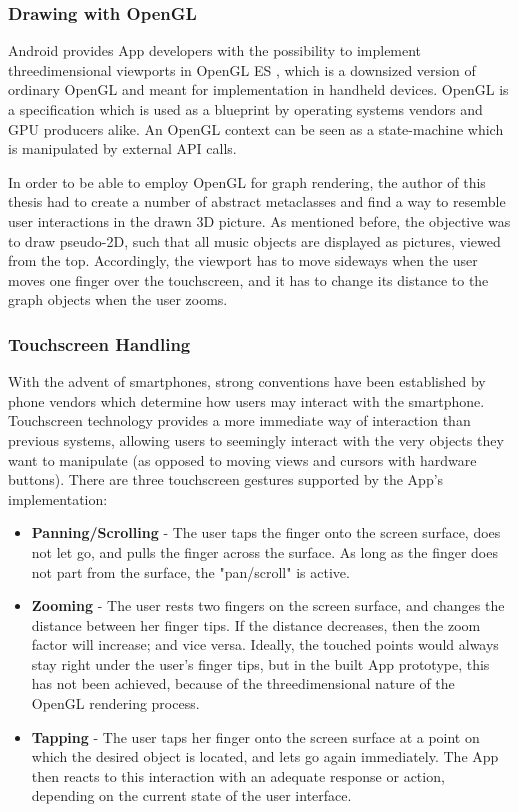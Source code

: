 \subsubsection{Drawing with OpenGL}

Android provides App developers with the possibility to implement threedimensional viewports in OpenGL ES \cite{url:opengles}, which is a downsized version of ordinary OpenGL and meant for implementation in handheld devices. OpenGL is a specification which is used as a blueprint by operating systems vendors and GPU producers alike. An OpenGL context can be seen as a state-machine which is manipulated by external API calls.

In order to be able to employ OpenGL for graph rendering, the author of this thesis had to create a number of abstract metaclasses and find a way to resemble user interactions in the drawn 3D picture. As mentioned before, the objective was to draw pseudo-2D, such that all music objects are displayed as pictures, viewed from the top. Accordingly, the viewport has to move sideways when the user moves one finger over the touchscreen, and it has to change its distance to the graph objects when the user zooms.

\subsubsection{Touchscreen Handling}

With the advent of smartphones, strong conventions have been established by phone vendors which determine how users may interact with the smartphone. Touchscreen technology provides a more immediate way of interaction than previous systems, allowing users to seemingly interact with the very objects they want to manipulate (as opposed to moving views and cursors with hardware buttons).
There are three touchscreen gestures supported by the App's implementation:

\begin{itemize}
	\item \textbf{Panning/Scrolling} - The user taps the finger onto the screen surface, does not let 
	go, and pulls the finger across the surface. As long as the finger does not part from the surface, 
	the "pan/scroll" is active.
	\item \textbf{Zooming} - The user rests two fingers on the screen surface, and changes the distance
	between her finger tips. If the distance decreases, then the zoom factor will increase; and vice versa.
	Ideally, the touched points would always stay right under the user's finger tips, but in the built
	App prototype, this has not been achieved, because of the threedimensional nature of the OpenGL
	rendering process.
	\item \textbf{Tapping} - The user taps her finger onto the screen surface at a point on which the
	desired object is located, and lets go again immediately. The App then reacts to this interaction
	with an adequate response or action, depending on the current state of the user interface.
\end{itemize}


